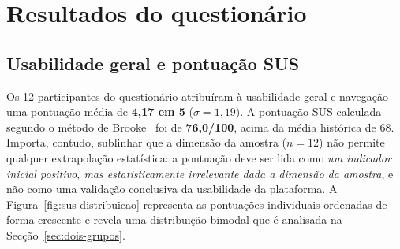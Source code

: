 \section{Resultados do questionário}
\label{sec:resultados-questionario}

\subsection*{Usabilidade geral e pontuação SUS}

Os 12 participantes do questionário atribuíram à usabilidade geral e navegação uma pontuação média de \textbf{4,17 em 5} ($\sigma = 1{,}19$). A pontuação SUS calculada segundo o método de Brooke~\cite{brooke1996sus} foi de \textbf{76,0/100}, acima da média histórica de 68. Importa, contudo, sublinhar que a dimensão da amostra ($n=12$) não permite qualquer extrapolação estatística: a pontuação deve ser lida como \emph{um indicador inicial positivo, mas estatisticamente irrelevante dada a dimensão da amostra}, e não como uma validação conclusiva da usabilidade da plataforma. A Figura~\ref{fig:sus-distribuicao} representa as pontuações individuais ordenadas de forma crescente e revela uma distribuição bimodal que é analisada na Secção~\ref{sec:dois-grupos}.

